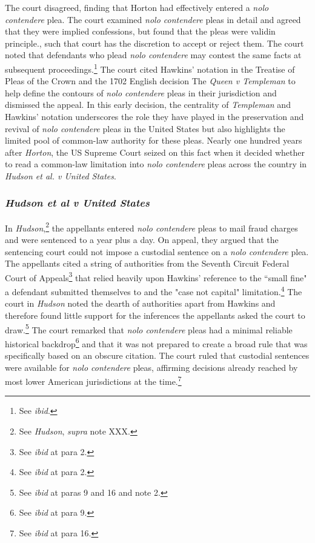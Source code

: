 The court disagreed, finding that Horton had effectively entered a \textit{nolo contendere} plea. The court examined \textit{nolo contendere} pleas in detail and agreed that they were implied confessions, but found that the pleas were validin principle., such that court has the discretion to accept or reject them. The court noted that defendants who plead \textit{nolo contendere} may contest the same facts at subsequent proceedings.\footnote{See \textit{ibid}.} The court cited Hawkins' notation in the Treatise of Pleas of the Crown and the 1702 English decision The \textit{Queen v Templeman} to help define the contours of \textit{nolo contendere} pleas in their jurisdiction and dismissed the appeal. In this early decision, the centrality of \textit{Templeman} and Hawkins' notation underscores the role they have played in the preservation and revival of \textit{nolo contendere} pleas in the United States but also highlights the limited pool of common-law authority for these pleas. Nearly one hundred years after \textit{Horton}, the US Supreme Court seized on this fact when it decided whether to read a common-law limitation into \textit{nolo contendere} pleas across the country in \textit{Hudson et al. v United States}.

\subsubsection{\textit{Hudson et al v United States}}

In \textit{Hudson},\footnote{See \textit{Hudson}, \textit{supra} note XXX.} the appellants entered \textit{nolo contendere} pleas to mail fraud charges and were sentenced to a year plus a day. On appeal, they argued that the sentencing court could not impose a custodial sentence on a \textit{nolo contendere} plea. The appellants cited a string of authorities from the Seventh Circuit Federal Court of Appeals\footnote{See \textit{ibid} at para 2.} that relied heavily upon Hawkins' reference to the ``small fine" a defendant submitted themselves to and the "case not capital" limitation.\footnote{See \textit{ibid} at para 2.} The court in \textit{Hudson} noted the dearth of authorities apart from Hawkins and therefore found little support for the inferences the appellants asked the court to draw.\footnote{See \textit{ibid} at paras 9 and 16 and note 2.} The court remarked that \textit{nolo contendere} pleas had a minimal reliable historical backdrop\footnote{See \textit{ibid} at para 9.} and that it was not prepared to create a broad rule that was specifically based on an obscure citation. The court ruled that custodial sentences were available for \textit{nolo contendere} pleas, affirming decisions already reached by most lower American jurisdictions at the time.\footnote{See \textit{ibid} at para 16.}


